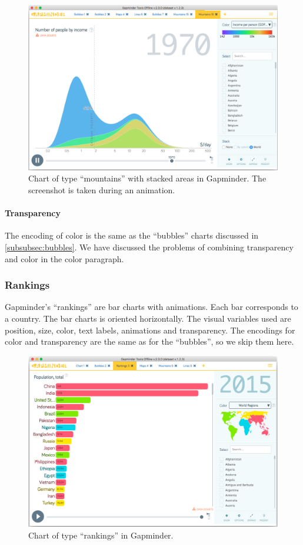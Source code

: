 \begin{figure}[h]
	\centering
	\includegraphics[width=0.95\columnwidth]{figures/mountains-animation}
	\caption{Chart of type ``mountains'' with stacked areas in Gapminder. The screenshot is taken during an animation.}
	\label{fig:mountains-animation}
\end{figure}

\paragraph{Transparency}
The encoding of color is the same as the ``bubbles'' charts discussed in \cref{subsubsec:bubbles}.
We have discussed the problems of combining transparency and color in the color paragraph.


\subsubsection{Rankings}
Gapminder's ``rankings'' are bar charts with animations.
Each bar corresponds to a country.
The bar charts is oriented horizontally.
The visual variables used are position, size, color, text labels, animations and transparency.
The encodings for color and transparency are the same as for the ``bubbles'', so we skip them here.

\begin{figure}[h]
	\centering
	\includegraphics[width=0.95\columnwidth]{figures/rankings}
	\caption{Chart of type ``rankings'' in Gapminder.}
	\label{fig:rankings}
\end{figure}

